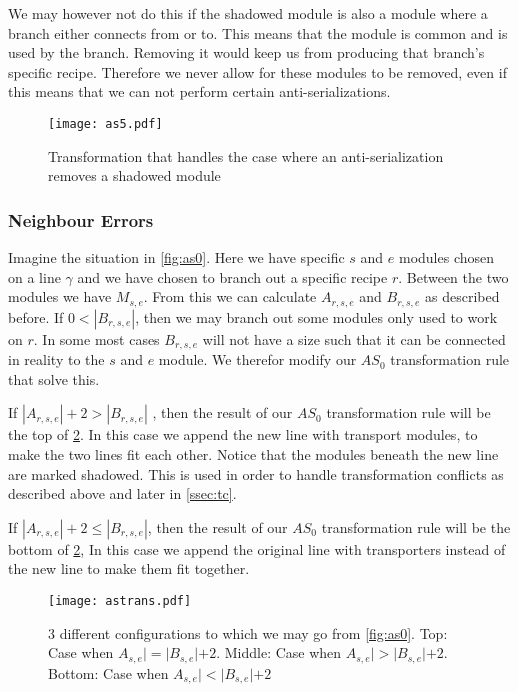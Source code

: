We may however not do this if the shadowed module is also a module where a branch either connects from or to. This means that the module is common and is used by the branch. Removing it would keep us from producing that branch's specific recipe. Therefore we never allow for these modules to be removed, even if this means that we can not perform certain anti-serializations.

\begin{figure}[H]
	\centering
	\texttt{[image: as5.pdf]}
	\caption{Transformation that handles the case where an anti-serialization removes a shadowed module}
	\label{fig:shadowexample}
\end{figure}


\subsubsection{Neighbour Errors}
Imagine the situation in \cref{fig:as0}. Here we have specific $s$ and $e$ modules chosen on a line $\gamma$ and we have chosen to branch out a specific recipe $r$. Between the two modules we have $M_{s,e}$. From this we can calculate $A_{r,s,e}$ and $B_{r,s,e}$ as described before. If $0 < |B_{r,s,e}|$, then we may branch out some modules only used to work on $r$. In some most cases $B_{r,s,e}$ will not have a size such that it can be connected in reality to the $s$ and $e$ module. We therefor modify our $AS_0$ transformation rule that solve this.

If $|A_{r,s,e}| + 2 > |B_{r,s,e}|$ , then the result of our $AS_0$ transformation rule will be the top of \cref{fig:astrans}. In this case we append the new line with transport modules, to make the two lines fit each other. Notice that the modules beneath the new line are marked shadowed. This is used in order to handle transformation conflicts as described above and later in \cref{ssec:tc}.


If $|A_{r,s,e}| + 2 \leq |B_{r,s,e}|$,  then the result of our $AS_0$ transformation rule will be the bottom of \cref{fig:astrans}, In this case we append the original line with transporters instead of the new line to make them fit together.

\begin{figure}[H]
	\centering
	\texttt{[image: astrans.pdf]}
	\caption{3 different configurations to which we may go from \cref{fig:as0}. Top: Case when $A_{s,e}| = |B_{s,e}| + 2$. Middle: Case when $A_{s,e}| > |B_{s,e}| + 2$. Bottom: Case when $A_{s,e}| < |B_{s,e}| + 2$ }
	\label{fig:astrans}
\end{figure}



